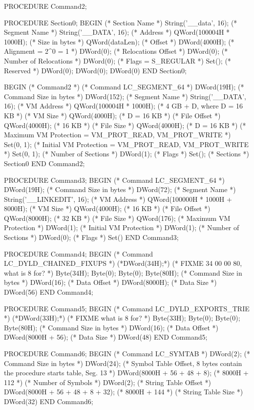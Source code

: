 \documentclass[utf8]{lgu}
\begin{document}
\begin{modula2long}
PROCEDURE Command2;

  PROCEDURE Section0;
  BEGIN
    (* Section Name *)
    String('__data', 16);
    (* Segment Name *)
    String('__DATA', 16);
    (* Address *)
    QWord(100004H * 1000H);
    (* Size in bytes *)
    QWord(dataLen);
    (* Offset *)
    DWord(4000H);
    (* Alignment = 2^0 = 1 *)
    DWord(0);
    (* Relocations Offset *)
    DWord(0);
    (* Number of Relocations *)
    DWord(0);
    (* Flags = S_REGULAR *)
    Set({});
    (* Reserved *)
    DWord(0);
    DWord(0);
    DWord(0)
  END Section0;

BEGIN (* Command2 *)
  (* Command LC_SEGMENT_64 *)
  DWord(19H);
  (* Command Size in bytes *)
  DWord(152);
  (* Segment Name *)
  String('__DATA', 16);
  (* VM Address *)
  QWord(100004H * 1000H); (* 4 GB + D, where D = 16 KB *)
  (* VM Size *)
  QWord(4000H); (* D = 16 KB *)
  (* File Offset *)
  QWord(4000H); (* 16 KB *)
  (* File Size *)
  QWord(4000H); (* D = 16 KB *)
  (* Maximum VM Protection = VM_PROT_READ, VM_PROT_WRITE *)
  Set({0, 1});
  (* Initial VM Protection = VM_PROT_READ, VM_PROT_WRITE *)
  Set({0, 1});
  (* Number of Sections *)
  DWord(1);
  (* Flags *)
  Set({});
  (* Sections *)
  Section0
END Command2;

PROCEDURE Command3;
BEGIN
  (* Command LC_SEGMENT_64 *)
  DWord(19H);
  (* Command Size in bytes *)
  DWord(72);
  (* Segment Name *)
  String('__LINKEDIT', 16);
  (* VM Address *)
  QWord(100000H * 1000H + 8000H);
  (* VM Size *)
  QWord(4000H); (* 16 KB *)
  (* File Offset *)
  QWord(8000H); (* 32 KB *)
  (* File Size *)
  QWord(176);
  (* Maximum VM Protection *)
  DWord(1);
  (* Initial VM Protection *)
  DWord(1);
  (* Number of Sections *)
  DWord(0);
  (* Flags *)
  Set({})
END Command3;

PROCEDURE Command4;
BEGIN
  (* Command LC_DYLD_CHAINED_FIXUPS *)
  (*DWord(34H);*) (* FIXME 34 00 00 80, what is 8 for? *)
  Byte(34H); Byte(0); Byte(0); Byte(80H);
  (* Command Size in bytes *)
  DWord(16);
  (* Data Offset *)
  DWord(8000H);
  (* Data Size *)
  DWord(56)
END Command4;

PROCEDURE Command5;
BEGIN
  (* Command LC_DYLD_EXPORTS_TRIE *)
  (*DWord(33H);*) (* FIXME what is 8 for? *)
  Byte(33H); Byte(0); Byte(0); Byte(80H);
  (* Command Size in bytes *)
  DWord(16);
  (* Data Offset *)
  DWord(8000H + 56);
  (* Data Size *)
  DWord(48)
END Command5;

PROCEDURE Command6;
BEGIN
  (* Command LC_SYMTAB *)
  DWord(2);
  (* Command Size in bytes *)
  DWord(24);
  (* Symbol Table Offset, 8 bytes contain the procedure starts table, Seg. 13 *)
  DWord(8000H + 56 + 48 + 8); (* 8000H + 112 *)
  (* Number of Symbols *)
  DWord(2);
  (* String Table Offset *)
  DWord(8000H + 56 + 48 + 8 + 32); (* 8000H + 144 *)
  (* String Table Size *)
  DWord(32)
END Command6;


\end{modula2long}
\end{document}
